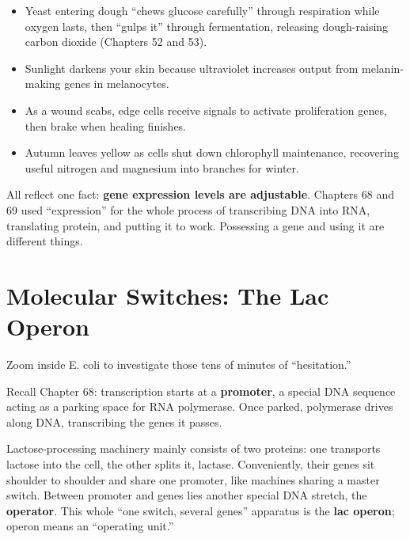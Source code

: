 \begin{itemize}[itemsep=2pt]
\item Yeast entering dough ``chews glucose carefully'' through respiration while oxygen lasts, then ``gulps it'' through fermentation, releasing dough-raising carbon dioxide (Chapters 52 and 53).
\item Sunlight darkens your skin because ultraviolet increases output from melanin-making genes in melanocytes.
\item As a wound scabs, edge cells receive signals to activate proliferation genes, then brake when healing finishes.
\item Autumn leaves yellow as cells shut down chlorophyll maintenance, recovering useful nitrogen and magnesium into branches for winter.
\end{itemize}

All reflect one fact: \textbf{gene expression levels are adjustable}. Chapters 68 and 69 used ``expression'' for the whole process of transcribing DNA into RNA, translating protein, and putting it to work. Possessing a gene and using it are different things.

\section{Molecular Switches: The Lac Operon}

Zoom inside E. coli to investigate those tens of minutes of ``hesitation.''

Recall Chapter 68: transcription starts at a \textbf{promoter}, a special DNA sequence acting as a parking space for RNA polymerase. Once parked, polymerase drives along DNA, transcribing the genes it passes.

Lactose-processing machinery mainly consists of two proteins: one transports lactose into the cell, the other splits it, lactase. Conveniently, their genes sit shoulder to shoulder and share one promoter, like machines sharing a master switch. Between promoter and genes lies another special DNA stretch, the \textbf{operator}. This whole ``one switch, several genes'' apparatus is the \textbf{lac operon}; operon means an ``operating unit.''

